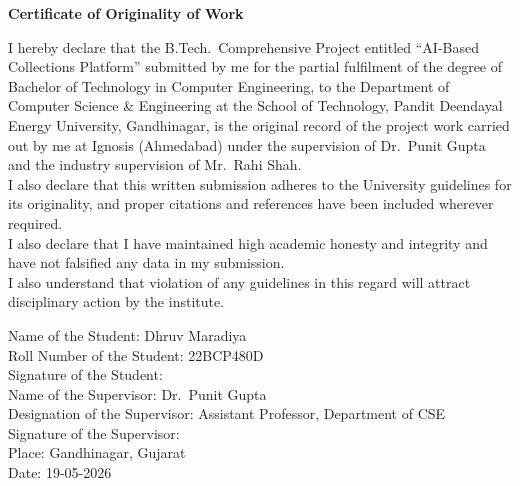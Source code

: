 \thispagestyle{plain}
\begin{center}
{\Large \bf Certificate of Originality of Work}
\end{center}
\vspace{0.6cm}

\begin{justify}
I hereby declare that the B.Tech.\ Comprehensive Project entitled ``AI-Based Collections Platform'' submitted by me for the partial fulfilment of the degree of Bachelor of Technology in Computer Engineering, to the Department of Computer Science \& Engineering at the School of Technology, Pandit Deendayal Energy University, Gandhinagar, is the original record of the project work carried out by me at Ignosis (Ahmedabad) under the supervision of Dr.~Punit Gupta and the industry supervision of Mr.~Rahi Shah.
\\[0.4cm]
I also declare that this written submission adheres to the University guidelines for its originality, and proper citations and references have been included wherever required.
\\[0.4cm]
I also declare that I have maintained high academic honesty and integrity and have not falsified any data in my submission.
\\[0.4cm]
I also understand that violation of any guidelines in this regard will attract disciplinary action by the institute.
\end{justify}

\vspace{0.8cm}

\noindent
Name of the Student: Dhruv Maradiya\\[0.3cm]
Roll Number of the Student: 22BCP480D\\[0.3cm]
Signature of the Student:\\[0.6cm]
Name of the Supervisor: Dr.~Punit Gupta\\[0.3cm]
Designation of the Supervisor: Assistant Professor, Department of CSE\\[0.3cm]
Signature of the Supervisor:\\[0.6cm]
Place: Gandhinagar, Gujarat\\[0.3cm]
Date: 19-05-2026

\clearpage

